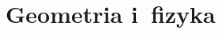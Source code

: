 \documentclass[a4paper,11pt]{article}
\begin{document}
























\section{Geometria i~fizyka}
\end{document}
